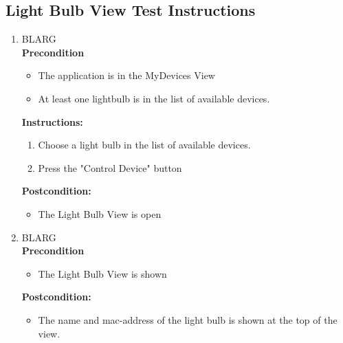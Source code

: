 \documentclass[a4paper]{article}
\newlength{\testlabellength}
\newenvironment{testlist}{\begin{enumerate}[label=\bfseries Instruction \thesubsection.\arabic* , labelindent=0pt, labelwidth=\testlabellength , leftmargin=2cm]}{\end{enumerate}}
\newenvironment{precondition}{
{\color{white}BLARG}\\ 
\textbf{Precondition}
\begin{itemize}[labelindent=0cm, labelwidth=2cm , leftmargin=1cm]
}
{\end{itemize}}
\newenvironment{instruction}{
\textbf{Instructions:}
\begin{enumerate}[label=\bfseries  \arabic*., labelindent=0cm, labelwidth=2cm , leftmargin=1cm]
}
{\end{enumerate}}
\newenvironment{postcondition}{
\textbf{Postcondition:}
\begin{itemize}[labelindent=0cm, labelwidth=2cm , leftmargin=1cm]
}
{\end{itemize}}
\begin{document}
\begin{appendices}
\begin{testlist}
\end{testlist}

\subsection{Light Bulb View Test Instructions}
\begin{testlist}

    \item 	\begin{precondition}
    			\item The application is in the MyDevices View
    			\item At least one lightbulb is in the list of available devices.
    		\end{precondition}
    		\begin{instruction}
    				\item Choose a light bulb in the list of available devices.
    				\item Press the "Control Device" button
    		\end{instruction}
    		\begin{postcondition}
    			\item The Light Bulb View is open
    		\end{postcondition}

	
	\item 	\begin{precondition}
				\item The Light Bulb View is shown
			\end{precondition}
    		\begin{postcondition}
    			\item The name and mac-address of the light bulb is shown at the top of the view.
    		\end{postcondition}
    	
	

\end{testlist}
\end{appendices}
\end{document}
